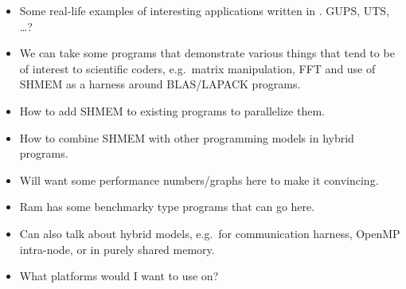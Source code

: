 \begin{itemize}

\item Some real-life examples of interesting applications written in
  \openshmem.  GUPS, UTS, \ldots?

\item We can take some programs that demonstrate various things that
  tend to be of interest to scientific coders, e.g.\ matrix
  manipulation, FFT and use of SHMEM as a harness around BLAS/LAPACK
  programs.

\item How to add SHMEM to existing programs to parallelize them.

\item How to combine SHMEM with other programming models in hybrid programs.

\item Will want some performance numbers/graphs here to make it
  convincing.

\item Ram has some benchmarky type programs that can go here.

\item Can also talk about hybrid models, e.g.\ \openshmem for
  communication harness, OpenMP intra-node, or \openshmem in purely
  shared memory.

\item What platforms would I want to use \openshmem on?

\end{itemize}
